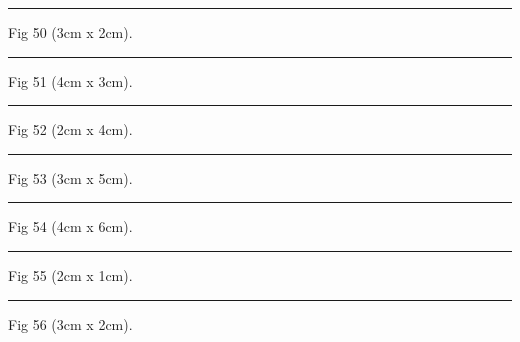 \documentclass[a4paper,11pt]{article}
\begin{document}
\begin{swarmwrap}%
  \begin{minipage}[t]{3cm}
    \centering
    \rule{\linewidth}{2cm}
    {\footnotesize Fig 50 (3cm x 2cm).}
  \end{minipage}%
\end{swarmwrap}%
\swarmwrapnext
\lipsum[50]%

\begin{swarmwrap}%
  \begin{minipage}[t]{4cm}
    \centering
    \rule{\linewidth}{3cm}
    {\footnotesize Fig 51 (4cm x 3cm).}
  \end{minipage}%
\end{swarmwrap}%
\swarmwrapnext
\lipsum[51]%

\begin{swarmwrap}%
  \begin{minipage}[t]{2cm}
    \centering
    \rule{\linewidth}{4cm}
    {\footnotesize Fig 52 (2cm x 4cm).}
  \end{minipage}%
\end{swarmwrap}%
\swarmwrapnext
\lipsum[52]%

\begin{swarmwrap}%
  \begin{minipage}[t]{3cm}
    \centering
    \rule{\linewidth}{5cm}
    {\footnotesize Fig 53 (3cm x 5cm).}
  \end{minipage}%
\end{swarmwrap}%
\swarmwrapnext
\lipsum[53]%

\begin{swarmwrap}%
  \begin{minipage}[t]{4cm}
    \centering
    \rule{\linewidth}{6cm}
    {\footnotesize Fig 54 (4cm x 6cm).}
  \end{minipage}%
\end{swarmwrap}%
\swarmwrapnext
\lipsum[54]%

\begin{swarmwrap}%
  \begin{minipage}[t]{2cm}
    \centering
    \rule{\linewidth}{1cm}
    {\footnotesize Fig 55 (2cm x 1cm).}
  \end{minipage}%
\end{swarmwrap}%
\swarmwrapnext
\lipsum[55]%

\begin{swarmwrap}%
  \begin{minipage}[t]{3cm}
    \centering
    \rule{\linewidth}{2cm}
    {\footnotesize Fig 56 (3cm x 2cm).}
  \end{minipage}%
\end{swarmwrap}%
\swarmwrapnext
\lipsum[56]%
\end{document}
